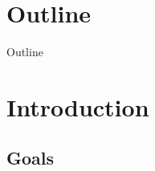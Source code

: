 \section*{Outline}

\begin{frame}{Outline}
  \tableofcontents[subsectionstyle=hide]
\end{frame}



\section{Introduction}

\subsection{Goals}

